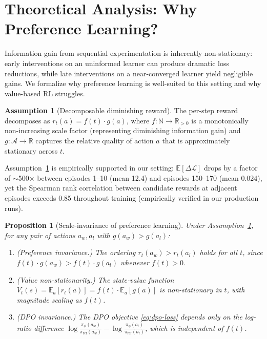 \documentclass{article}
\theoremstyle{plain}
\newtheorem{proposition}[theorem]{Proposition}
\theoremstyle{definition}
\newtheorem{assumption}[theorem]{Assumption}
\theoremstyle{remark}
\begin{document}
\section{Theoretical Analysis: Why Preference Learning?}
\label{sec:theory}

Information gain from sequential experimentation is inherently non-stationary: early interventions on an uninformed learner can produce dramatic loss reductions, while late interventions on a near-converged learner yield negligible gains. We formalize why preference learning is well-suited to this setting and why value-based RL struggles.

\begin{assumption}[Decomposable diminishing reward]
\label{ass:diminish}
The per-step reward decomposes as $r_t(a) = f(t) \cdot g(a)$, where $f : \mathbb{N} \to \mathbb{R}_{>0}$ is a monotonically non-increasing scale factor (representing diminishing information gain) and $g : \mathcal{A} \to \mathbb{R}$ captures the relative quality of action $a$ that is approximately stationary across $t$.
\end{assumption}

Assumption~\ref{ass:diminish} is empirically supported in our setting: $\mathbb{E}[\Delta\mathcal{L}]$ drops by a factor of $\sim$500$\times$ between episodes 1--10 (mean 12.4) and episodes 150--170 (mean 0.024), yet the Spearman rank correlation between candidate rewards at adjacent episodes exceeds 0.85 throughout training (empirically verified in our production runs).

\begin{proposition}[Scale-invariance of preference learning]
\label{prop:scale-invariance}
Under Assumption~\ref{ass:diminish}, for any pair of actions $a_w, a_l$ with $g(a_w) > g(a_l)$:
\begin{enumerate}[leftmargin=1.5em,topsep=0.2em,itemsep=0.1em]
\item \emph{(Preference invariance.)} The ordering $r_t(a_w) > r_t(a_l)$ holds for all $t$, since $f(t) \cdot g(a_w) > f(t) \cdot g(a_l)$ whenever $f(t) > 0$.
\item \emph{(Value non-stationarity.)} The state-value function $V_t(s) = \mathbb{E}_a[r_t(a)] = f(t) \cdot \mathbb{E}_a[g(a)]$ is non-stationary in $t$, with magnitude scaling as $f(t)$.
\item \emph{(DPO invariance.)} The DPO objective \eqref{eq:dpo-loss} depends only on the log-ratio difference $\log\tfrac{\pi_\phi(a_w)}{\pi_\text{ref}(a_w)} - \log\tfrac{\pi_\phi(a_l)}{\pi_\text{ref}(a_l)}$, which is independent of $f(t)$.
\end{enumerate}
\end{proposition}
\end{document}
